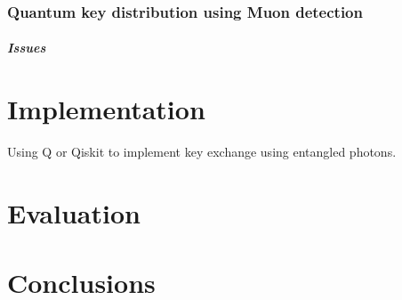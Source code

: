 \documentclass{article}
\begin{document}
\subsubsection{Quantum key distribution using Muon detection }


\subparagraph{Issues}


\section{Implementation}

Using Q or Qiskit to implement key exchange using entangled photons.

\section{Evaluation}

\section{Conclusions}

\printbibliography
\end{document}
